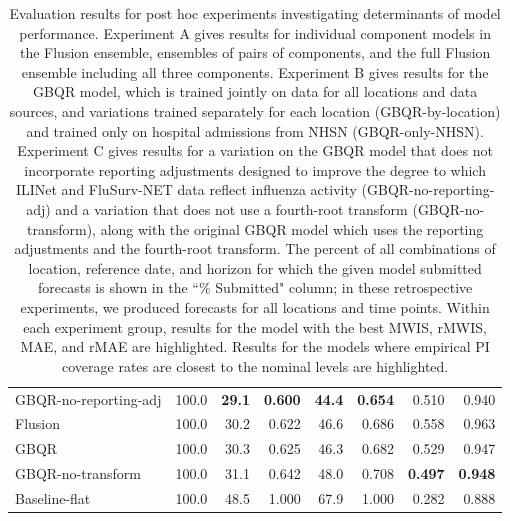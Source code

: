 \documentclass{article}\usepackage[]{graphicx}\usepackage[]{xcolor}
\begin{document}
\begin{table}[htbp]
\begin{tabular}{lrrrrrrr}
  \midrule
GBQR-no-reporting-adj & 100.0 & \textbf{29.1} & \textbf{0.600} & \textbf{44.4} & \textbf{0.654} & 0.510 & 0.940 \\ 
  Flusion & 100.0 & 30.2 & 0.622 & 46.6 & 0.686 & 0.558 & 0.963 \\ 
  GBQR & 100.0 & 30.3 & 0.625 & 46.3 & 0.682 & 0.529 & 0.947 \\ 
  GBQR-no-transform & 100.0 & 31.1 & 0.642 & 48.0 & 0.708 & \textbf{0.497} & \textbf{0.948} \\ 
  Baseline-flat & 100.0 & 48.5 & 1.000 & 67.9 & 1.000 & 0.282 & 0.888 \\ 
   \bottomrule
\end{tabular}
\caption{Evaluation results for post hoc experiments investigating determinants of model performance.  Experiment A gives results for individual component models in the Flusion ensemble, ensembles of pairs of components, and the full Flusion ensemble including all three components.  Experiment B gives results for the GBQR model, which is trained jointly on data for all locations and data sources, and variations trained separately for each location (GBQR-by-location) and trained only on hospital admissions from NHSN (GBQR-only-NHSN).  Experiment C gives results for a variation on the GBQR model that does not incorporate reporting adjustments designed to improve the degree to which ILINet and FluSurv-NET data reflect influenza activity (GBQR-no-reporting-adj) and a variation that does not use a fourth-root transform (GBQR-no-transform), along with the original GBQR model which uses the reporting adjustments and the fourth-root transform. The percent of all combinations of location, reference date, and horizon for which the given model submitted forecasts is shown in the ``\% Submitted" column; in these retrospective experiments, we produced forecasts for all locations and time points. Within each experiment group, results for the model with the best MWIS, rMWIS, MAE, and rMAE are highlighted. Results for the models where empirical PI coverage rates are closest to the nominal levels are highlighted.} 
\label{tab:scores_experiments}
\end{table}
\end{document}

